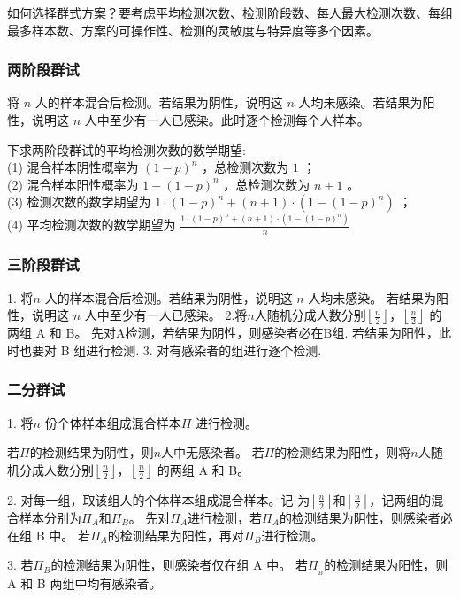 \documentclass[10t, a4paper, oneside]{ctexbook}
\begin{document}
如何选择群式方案？要考虑平均检测次数、检测阶段数、每人最大检测次数、每组最多样本数、方案的可操作性、检测的灵敏度与特异度等多个因素。

\subsubsection{两阶段群试}

将 $n$ 人的样本混合后检测。若结果为阴性，说明这 $n$ 人均未感染。若结果为阳性，说明这 $n$ 人中至少有一人已感染。此时逐个检测每个人样本。

下求两阶段群试的平均检测次数的数学期望:\\
(1) 混合样本阴性概率为 $(1-p)^n$ ，总检测次数为 $1$ ；\\
(2) 混合样本阳性概率为 $1-(1-p)^n$ ，总检测次数为 $n+1$ 。\\
(3) 检测次数的数学期望为 $1\cdot(1-p)^n+(n+1)\cdot(1-(1-p)^n)$ ；\\
(4) 平均检测次数的数学期望为 $\frac{1\cdot(1-p)^n+(n+1)\cdot(1-(1-p)^n)}{n}$
\subsubsection{三阶段群试}
1. 将$n$ 人的样本混合后检测。若结果为阴性，说明这 $n$ 人均未感染。
若结果为阳性，说明这 $n$ 人中至少有一人已感染。
2.将$n$人随机分成人数分别$\left\lfloor\frac n2\right\rfloor$，$\left\lfloor\frac n2\right\rfloor$
的两组 A 和 B。
先对A检测，若结果为阴性，则感染者必在B组.
若结果为阳性，此时也要对 B 组进行检测.
3. 对有感染者的组进行逐个检测.

\subsubsection{二分群试}

1. 将$n$ 份个体样本组成混合样本$\Pi$ 进行检测。

若$\Pi$的检测结果为阴性，则$n$人中无感染者。
若$\Pi$的检测结果为阳性，则将$n$人随机分成人数分别$\left\lfloor\frac n2\right\rfloor$，$\left\lfloor\frac n2\right\rfloor$
的两组 A 和 B。

2. 对每一组，取该组人的个体样本组成混合样本。记 为$\left\lfloor\frac n2\right\rfloor$和$\left\lfloor\frac n2\right\rfloor$，记两组的混合样本分别为$\Pi_{A}$和$\Pi_{B}$。
先对$\Pi_{A}$进行检测，若$\Pi_{A}$的检测结果为阴性，则感染者必在组 B 中。
若$\Pi_{A}$的检测结果为阳性，再对$\Pi_{B}$进行检测。

3. 若$\Pi_{B}$的检测结果为阴性，则感染者仅在组 A 中。
若$\Pi_{_{B}}$的检测结果为阳性，则 A 和 B 两组中均有感染者。
\end{document}

